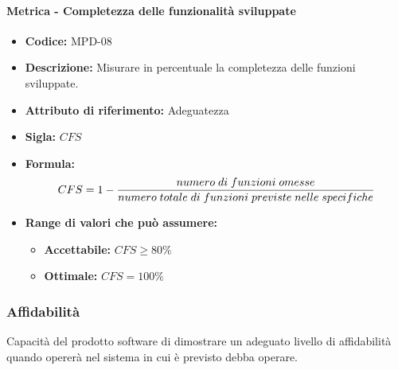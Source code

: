     \paragraph{Metrica - Completezza delle funzionalità sviluppate} 
        \begin{itemize}
        \item  \textbf{Codice:} MPD-08
        \item  \textbf{Descrizione:} Misurare in percentuale la completezza delle funzioni sviluppate.
        \item  \textbf{Attributo di riferimento:} Adeguatezza
        \item  \textbf{Sigla:} $CFS$
        \item  \textbf{Formula:} $$CFS = 1 - { numero \; di \; funzioni \; omesse \over numero \; totale \; di \; funzioni \; previste \; nelle \; specifiche  }$$

        \item \textbf{Range di valori che può assumere:}
        \begin{itemize}
            \item \textbf{Accettabile:} $CFS \geq 80\%$
            \item \textbf{Ottimale:} $CFS = 100\%$
        \end{itemize}
    \end{itemize}
              
\subsubsection{Affidabilità}
   Capacità del prodotto software di dimostrare un adeguato livello di affidabilità quando opererà nel sistema in cui è previsto debba operare.
       
